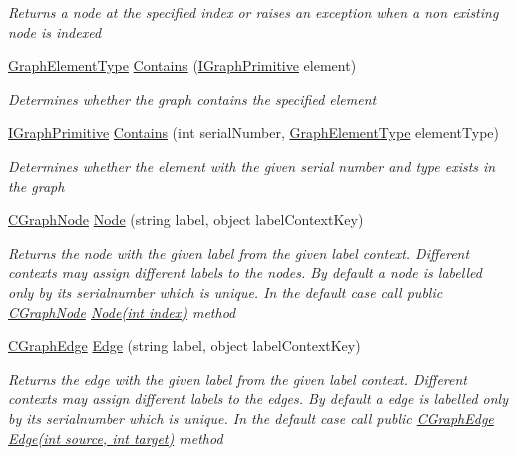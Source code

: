 \begin{DoxyCompactItemize}
\begin{DoxyCompactList}\small\item\em Returns a node at the specified index or raises an exception when a non existing node is indexed \end{DoxyCompactList}\item 
\hyperlink{namespace_graph_library_1_1_generics_a919a165f16deccdd1b3d7e8a93423fbc}{Graph\+Element\+Type} \hyperlink{class_graph_library_1_1_c_graph_a11e37ac22c8c9770a53ef80e54c7adfa}{Contains} (\hyperlink{interface_graph_library_1_1_generics_1_1_i_graph_primitive}{I\+Graph\+Primitive} element)
\begin{DoxyCompactList}\small\item\em Determines whether the graph contains the specified element \end{DoxyCompactList}\item 
\hyperlink{interface_graph_library_1_1_generics_1_1_i_graph_primitive}{I\+Graph\+Primitive} \hyperlink{class_graph_library_1_1_c_graph_aafdb175ad7467a414d37eecac0ea05d1}{Contains} (int serial\+Number, \hyperlink{namespace_graph_library_1_1_generics_a919a165f16deccdd1b3d7e8a93423fbc}{Graph\+Element\+Type} element\+Type)
\begin{DoxyCompactList}\small\item\em Determines whether the element with the given serial number and type exists in the graph \end{DoxyCompactList}\item 
\hyperlink{class_graph_library_1_1_c_graph_node}{C\+Graph\+Node} \hyperlink{class_graph_library_1_1_c_graph_a6a468edc9fb6a205ddbe5e8de847a745}{Node} (string label, object label\+Context\+Key)
\begin{DoxyCompactList}\small\item\em Returns the node with the given label from the given label context. Different contexts may assign different labels to the nodes. By default a node is labelled only by its serialnumber which is unique. In the default case call public \hyperlink{class_graph_library_1_1_c_graph_node}{C\+Graph\+Node} \hyperlink{class_graph_library_1_1_c_graph_a93fba5a60f4cec728a6511049bc7c079}{Node(int index)} method \end{DoxyCompactList}\item 
\hyperlink{class_graph_library_1_1_c_graph_edge}{C\+Graph\+Edge} \hyperlink{class_graph_library_1_1_c_graph_aed4132c7cc61ce43d85a3cde3b6334af}{Edge} (string label, object label\+Context\+Key)
\begin{DoxyCompactList}\small\item\em Returns the edge with the given label from the given label context. Different contexts may assign different labels to the edges. By default a edge is labelled only by its serialnumber which is unique. In the default case call public \hyperlink{class_graph_library_1_1_c_graph_edge}{C\+Graph\+Edge} \hyperlink{class_graph_library_1_1_c_graph_a0aa4b87cbe9c0c8f9956ebc9d45f11f8}{Edge(int source, int target)} method \end{DoxyCompactList}\item 

\end{DoxyCompactItemize}
